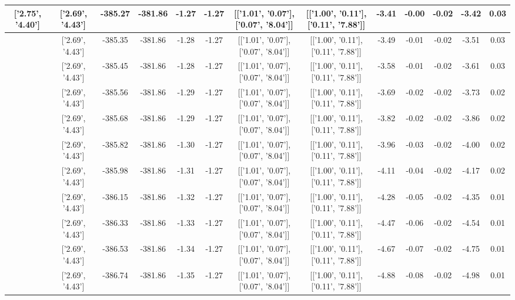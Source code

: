 \begin{table}[htbp]
\begin{adjustbox}{angle=90}
\begin{tabular}{|c|c|c|c|c|c|c|c|c|c|c|c|c|}
 ['2.75', '4.40'] & ['2.69', '4.43'] & -385.27 & -381.86 & -1.27 & -1.27 & [['1.01', '0.07'], ['0.07', '8.04']] & [['1.00', '0.11'], ['0.11', '7.88']] & -3.41 & -0.00 & -0.02 & -3.42 & 0.03\\ \hline
 ['2.77', '4.40'] & ['2.69', '4.43'] & -385.35 & -381.86 & -1.28 & -1.27 & [['1.01', '0.07'], ['0.07', '8.04']] & [['1.00', '0.11'], ['0.11', '7.88']] & -3.49 & -0.01 & -0.02 & -3.51 & 0.03\\ \hline
 ['2.78', '4.39'] & ['2.69', '4.43'] & -385.45 & -381.86 & -1.28 & -1.27 & [['1.01', '0.07'], ['0.07', '8.04']] & [['1.00', '0.11'], ['0.11', '7.88']] & -3.58 & -0.01 & -0.02 & -3.61 & 0.03\\ \hline
 ['2.79', '4.38'] & ['2.69', '4.43'] & -385.56 & -381.86 & -1.29 & -1.27 & [['1.01', '0.07'], ['0.07', '8.04']] & [['1.00', '0.11'], ['0.11', '7.88']] & -3.69 & -0.02 & -0.02 & -3.73 & 0.02\\ \hline
 ['2.80', '4.38'] & ['2.69', '4.43'] & -385.68 & -381.86 & -1.29 & -1.27 & [['1.01', '0.07'], ['0.07', '8.04']] & [['1.00', '0.11'], ['0.11', '7.88']] & -3.82 & -0.02 & -0.02 & -3.86 & 0.02\\ \hline
 ['2.82', '4.37'] & ['2.69', '4.43'] & -385.82 & -381.86 & -1.30 & -1.27 & [['1.01', '0.07'], ['0.07', '8.04']] & [['1.00', '0.11'], ['0.11', '7.88']] & -3.96 & -0.03 & -0.02 & -4.00 & 0.02\\ \hline
 ['2.83', '4.37'] & ['2.69', '4.43'] & -385.98 & -381.86 & -1.31 & -1.27 & [['1.01', '0.07'], ['0.07', '8.04']] & [['1.00', '0.11'], ['0.11', '7.88']] & -4.11 & -0.04 & -0.02 & -4.17 & 0.02\\ \hline
 ['2.84', '4.36'] & ['2.69', '4.43'] & -386.15 & -381.86 & -1.32 & -1.27 & [['1.01', '0.07'], ['0.07', '8.04']] & [['1.00', '0.11'], ['0.11', '7.88']] & -4.28 & -0.05 & -0.02 & -4.35 & 0.01\\ \hline
 ['2.85', '4.35'] & ['2.69', '4.43'] & -386.33 & -381.86 & -1.33 & -1.27 & [['1.01', '0.07'], ['0.07', '8.04']] & [['1.00', '0.11'], ['0.11', '7.88']] & -4.47 & -0.06 & -0.02 & -4.54 & 0.01\\ \hline
 ['2.87', '4.35'] & ['2.69', '4.43'] & -386.53 & -381.86 & -1.34 & -1.27 & [['1.01', '0.07'], ['0.07', '8.04']] & [['1.00', '0.11'], ['0.11', '7.88']] & -4.67 & -0.07 & -0.02 & -4.75 & 0.01\\ \hline
 ['2.88', '4.34'] & ['2.69', '4.43'] & -386.74 & -381.86 & -1.35 & -1.27 & [['1.01', '0.07'], ['0.07', '8.04']] & [['1.00', '0.11'], ['0.11', '7.88']] & -4.88 & -0.08 & -0.02 & -4.98 & 0.01\\ \hline

\end{tabular}
\end{adjustbox}
\end{table}
